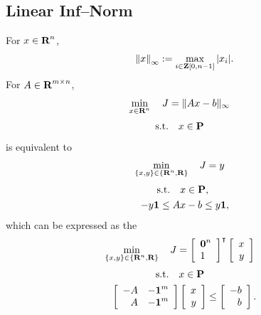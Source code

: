 \documentclass{article}
\begin{document}
\subsection{Linear Inf--Norm}

    For $x\in\textbf{R}^n$,
    \begin{align}
        \left\| x \right\|_\infty := \max_{i\in\textbf{Z}[0,n-1]} |x_i|.
    \end{align}
    For $A\in\textbf{R}^{m\times n}$,
        \begin{align*}
            \min_{x\in\textbf{R}^n}\quad J &= \|A x-b\|_\infty
        \end{align*}
        \begin{align*}
            \text{s.t.}\quad &x\in\textbf{P}
        \end{align*}
    is equivalent to 
    \cite[p.~294]{bv_cvxbook}
    \begin{align*}
        \min_{\{x,y\}\in\{\textbf{R}^n,\textbf{R}\}}\quad J&= y
    \end{align*}
    \begin{align*}
        \text{s.t.}\quad &x\in\textbf{P},
        \\
        -y \textbf{1}\leq A &x-b \leq y \textbf{1},
    \end{align*}
    which can be expressed as the \LP
    \begin{align*}
        \min_{\{x,y\}\in\{\textbf{R}^n,\textbf{R}\}}
        \quad J&=   \left[\begin{array}{l}
                            \textbf{0}^{n}  \\   1
                        \end{array}\right]^\intercal
                        \left[\begin{array}{r}
                            x   \\
                            y
                        \end{array}\right]
    \end{align*}
    \begin{align*}
        \text{s.t.}\quad &x\in\textbf{P}\\
            \left[\begin{array}{rr}
                        -A  &   -\textbf{1}^{m}   \\
                        A   &   -\textbf{1}^{m} 
                    \end{array}\right]&
                    \left[\begin{array}{r}
                    x\\
                    y
                    \end{array}\right]
                \leq
                    \left[\begin{array}{r}
                        -b  \\
                        b
                    \end{array}\right].
    \end{align*}
\end{document}
